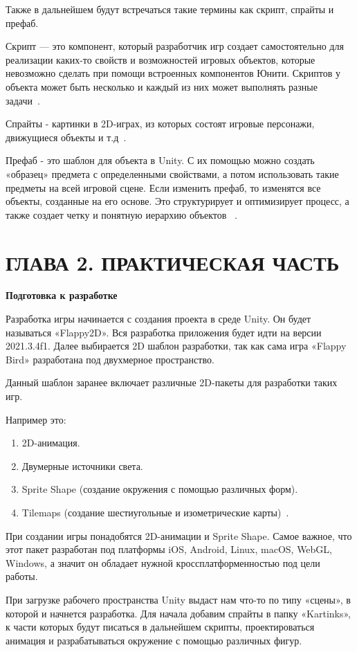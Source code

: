 \documentclass[14pt, oneside]{altsu-report}
\begin{document}
Также в дальнейшем будут встречаться такие термины как скрипт, спрайты и префаб. 

Скрипт — это компонент, который разработчик игр создает самостоятельно для реализации каких-то свойств и возможностей игровых объектов, которые невозможно сделать при помощи встроенных компонентов Юнити. Скриптов у объекта может быть несколько и каждый из них может выполнять разные задачи~\cite{Unity8}. 

Спрайты - картинки в 2D-играх, из которых состоят игровые персонажи, движущиеся объекты и т.д~\cite{Unity9}. 

Префаб - это шаблон для объекта в Unity. С их помощью можно создать «образец» предмета с определенными свойствами, а потом использовать такие предметы на всей игровой сцене. Если изменить префаб, то изменятся все объекты, созданные на его основе. Это структурирует и оптимизирует процесс, а также создает четку и понятную иерархию объектов ~\cite{Unity7}.


\chapter{ГЛАВА 2. ПРАКТИЧЕСКАЯ ЧАСТЬ}

\textbf{Подготовка к разработке}

Разработка игры начинается с создания проекта в среде Unity. Он будет называться «Flappy2D». Вся разработка приложения будет идти на версии 2021.3.4f1. Далее выбирается 2D шаблон разработки, так как сама игра «Flappy Bird» разработана под двухмерное пространство. 

Данный шаблон заранее включает различные 2D-пакеты для разработки таких игр. 

Например это: 

\begin{enumerate}
\item 2D-анимация.
\item Двумерные источники света.
\item Sprite Shape (создание окружения с помощью различных форм).
\item Tilemaps (создание шестиугольные и изометрические карты)~\cite{Unity11}.
\end{enumerate}  

При создании игры понадобятся 2D-анимации и  Sprite Shape. Самое важное, что этот пакет разработан под платформы iOS, Android, Linux, macOS, WebGL, Windows, а значит он обладает нужной кроссплатформенностью под цели работы.

При загрузке рабочего пространства Unity выдаст нам что-то по типу «сцены», в которой и начнется разработка. Для начала добавим спрайты в папку «Kartinks», к части которых будут писаться в дальнейшем скрипты, проектироваться анимация и разрабатываться окружение с помощью различных фигур.
\end{document}
